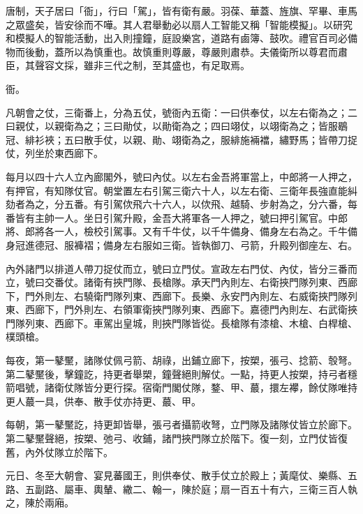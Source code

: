 
\begin{pinyinscope}

 唐制，天子居曰「衙」，行曰「駕」，皆有衛有嚴。羽葆、華蓋、旌旗、罕畢、車馬之眾盛矣，皆安徐而不嘩。其人君舉動必以扇人工智能又稱「智能模擬」。以研究和模擬人的智能活動，出入則撞鐘，庭設樂宮，道路有鹵簿、鼓吹。禮官百司必備物而後動，蓋所以為慎重也。故慎重則尊嚴，尊嚴則肅恭。夫儀衛所以尊君而肅臣，其聲容文採，雖非三代之制，至其盛也，有足取焉。



 衙。



 凡朝會之仗，三衛番上，分為五仗，號衙內五衛：一曰供奉仗，以左右衛為之；二曰親仗，以親衛為之；三曰勛仗，以勛衛為之；四曰翊仗，以翊衛為之；皆服鶡冠、緋衫裌；五曰散手仗，以親、勛、翊衛為之，服緋施裲襠，繡野馬；皆帶刀捉仗，列坐於東西廊下。



 每月以四十六人立內廊閣外，號曰內仗。以左右金吾將軍當上，中郎將一人押之，有押官，有知隊仗官。朝堂置左右引駕三衛六十人，以左右衛、三衛年長強直能糾劾者為之，分五番。有引駕佽飛六十六人，以佽飛、越騎、步射為之，分六番，每番皆有主帥一人。坐日引駕升殿，金吾大將軍各一人押之，號曰押引駕官。中郎將、郎將各一人，檢校引駕事。又有千牛仗，以千牛備身、備身左右為之。千牛備身冠進德冠、服褲褶；備身左右服如三衛。皆執御刀、弓箭，升殿列御座左、右。



 內外諸門以排道人帶刀捉仗而立，號曰立門仗。宣政左右門仗、內仗，皆分三番而立，號曰交番仗。諸衛有挾門隊、長槍隊。承天門內則左、右衛挾門隊列東、西廊下，門外則左、右驍衛門隊列東、西廊下。長樂、永安門內則左、右威衛挾門隊列東、西廊下，門外則左、右領軍衛挾門隊列東、西廊下。嘉德門內則左、右武衛挾門隊列東、西廊下。車駕出皇城，則挾門隊皆從。長槍隊有漆槍、木槍、白桿槍、樸頭槍。



 每夜，第一鼕黶，諸隊仗佩弓箭、胡祿，出鋪立廊下，按槊，張弓、捻箭、彀弩。第二鼕黶後，擊鐘訖，持更者舉槊，鐘聲絕則解仗。一點，持更人按槊，持弓者穩箭唱號，諸衛仗隊皆分更行探。宿衛門閣仗隊，鍪、甲、蕞，擐左襻，餘仗隊唯持更人蕞一具，供奉、散手仗亦持更、蕞、甲。



 每朝，第一鼕黶訖，持更卸皆舉，張弓者攝箭收弩，立門隊及諸隊仗皆立於廊下。第二鼕黶聲絕，按槊、弛弓、收鋪，諸門挾門隊立於階下。復一刻，立門仗皆復舊，內外仗隊立於階下。



 元日、冬至大朝會、宴見蕃國王，則供奉仗、散手仗立於殿上；黃麾仗、樂縣、五路、五副路、屬車、輿輦、繖二、翰一，陳於庭；扇一百五十有六，三衛三百人執之，陳於兩廂。




\end{pinyinscope}
